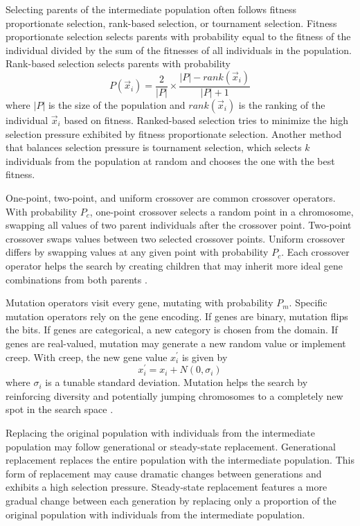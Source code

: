 \documentclass[twoside,11pt]{article}
\begin{document}
	Selecting parents of the intermediate population often follows fitness proportionate selection, rank-based selection, or tournament selection. Fitness proportionate selection selects parents with probability equal to the fitness of the individual divided by the sum of the fitnesses of all individuals in the population. Rank-based selection selects parents with probability
	$$P(\vec{x}_i) = \frac{2}{|P|} \times \frac{|P| - rank(\vec{x}_i)}{|P|+1}$$
	where $|P|$ is the size of the population and $rank(\vec{x}_i)$ is the ranking of the individual $\vec{x}_i$ based on fitness. Ranked-based selection tries to minimize the high selection pressure exhibited by fitness proportionate selection. Another method that balances selection pressure is tournament selection, which selects $k$ individuals from the population at random and chooses the one with the best fitness.

	One-point, two-point, and uniform crossover are common crossover operators. With probability $P_c$, one-point crossover selects a random point in a chromosome, swapping all values of two parent individuals after the crossover point. Two-point crossover swaps values between two selected crossover points. Uniform crossover differs by swapping values at any given point with probability $P_c$. Each crossover operator helps the search by creating children that may inherit more ideal gene combinations from both parents \citep{ga_tutorial}.
	
	
	Mutation operators visit every gene, mutating with probability $P_m$. Specific mutation operators rely on the gene encoding. If genes are binary, mutation flips the bits. If genes are categorical, a new category is chosen from the domain. If genes are real-valued, mutation may generate a new random value or implement creep. With creep, the new gene value $x_i^\prime$ is given by
	$$x_i^\prime = x_i + N(0, \sigma_i)$$
	where $\sigma_i$ is a tunable standard deviation. Mutation helps the search by reinforcing diversity and potentially jumping chromosomes to a completely new spot in the search space \citep{ga_tutorial}.
	
	Replacing the original population with individuals from the intermediate population may follow generational or steady-state replacement. Generational replacement replaces the entire population with the intermediate population. This form of replacement may cause dramatic changes between generations and exhibits a high selection pressure. Steady-state replacement features a more gradual change between each generation by replacing only a proportion of the original population with individuals from the intermediate population.
\end{document}
